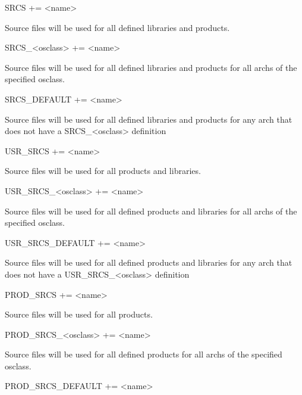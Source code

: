 \begin{description}

\item {}SRCS += \textless{}name\textgreater{}

Source files will be used for all defined libraries and products.

\item SRCS\_\textless{}osclass\textgreater{} += \textless{}name\textgreater{}

Source files will be used for all defined libraries and products for all archs of the specified osclass.

\item SRCS\_DEFAULT += \textless{}name\textgreater{}

Source files will be used for all defined libraries and products for any arch that does not have a 
SRCS\_\textless{}osclass\textgreater{} definition

\item

\item {}USR\_SRCS += \textless{}name\textgreater{}

Source files will be used for all products and libraries.

\item USR\_SRCS\_\textless{}osclass\textgreater{} += \textless{}name\textgreater{}

Source files will be used for all defined products and libraries for all archs of the specified osclass.

\item USR\_SRCS\_DEFAULT += \textless{}name\textgreater{}

Source files will be used for all defined products and libraries for any arch that does not have a 
USR\_SRCS\_\textless{}osclass\textgreater{} definition

\item

\item {}PROD\_SRCS += \textless{}name\textgreater{}

Source files will be used for all products.

\item PROD\_SRCS\_\textless{}osclass\textgreater{} += \textless{}name\textgreater{}

Source files will be used for all defined products for all archs of the specified osclass.

\item PROD\_SRCS\_DEFAULT += \textless{}name\textgreater{}


\end{description}
